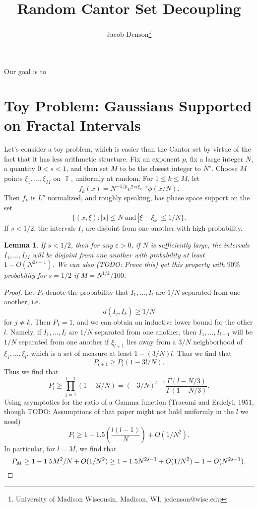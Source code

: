 \documentclass[dvipsnames,letterpaper,12pt]{article}
\title{Random Cantor Set Decoupling}
\author{Jacob Denson\footnote{University of Madison Wisconsin, Madison, WI, jcdenson@wisc.edu}}
\numberwithin{equation}{section}
\DeclareMathOperator{\TT}{\mathbb{T}}
\newtheorem{lemma}[theorem]{Lemma}
\numberwithin{theorem}{section}
\begin{document}
\maketitle

Our goal is to 

\section{Toy Problem: Gaussians Supported on Fractal Intervals}

Let's consider a toy problem, which is easier than the Cantor set by virtue of the fact that it has less arithmetic structure. Fix an exponent $p$, fix a large integer $N$, a quantity $0 < s < 1$, and then set $M$ to be the closest integer to $N^s$. Choose $M$ points $\xi_1,\dots,\xi_M$ on $\TT$, uniformly at random. For $1 \leq k \leq M$, let
%
\[ f_k(x) = N^{-1/p} e^{2 \pi i \xi_k \cdot x} \phi(x/N). \]
%
Then $f_k$ is $L^p$ normalized, and roughly speaking, has phase space support on the set
%
\[ \{ (x,\xi) : |x| \leq N\ \text{and}\ |\xi - \xi_k| \leq 1/N \}. \]
%
If $s < 1/2$, the intervals $I_j$ are disjoint from one another with high probability.

\begin{lemma}
    If $s < 1/2$, then for any $\varepsilon > 0$, if $N$ is sufficiently large, the intervals $I_1,\dots,I_M$ will be disjoint from one another with probability at least $1 - O(N^{2s - 1})$. We can also (TODO: Prove this) get this property with $90\%$ probability for $s = 1/2$ if $M = N^{1/2} / 100$.
\end{lemma}
\begin{proof}
    Let $P_l$ denote the probability that $I_1,\dots,I_l$ are $1/N$ separated from one another, i.e.
    \[ d(I_j, I_k) \geq 1/N \]
    for $j \neq k$. Then $P_1 = 1$, and we can obtain an inductive lower bound for the other $l$. Namely, if $I_1,\dots,I_l$ are $1/N$ separated from one another, then $I_1,\dots,I_{l+1}$ will be $1/N$ separated from one another if $\xi_{l+1}$ lies away from a $3/N$ neighborhood of $\xi_1,\dots,\xi_l$, which is a set of measure at least $1 - (3/N) l$. Thus we find that
    \[ P_{l+1} \geq P_l (1 - 3l/N). \]
    Thus we find that
    \[ P_l \geq \prod_{j = 1}^{l-1} (1 - 3l/N) = (-3/N)^{l-1} \frac{\Gamma(l - N/3)}{\Gamma(1 - N/3)}. \]
    Using asymptotics for the ratio of a Gamma function (Tracomi and Erdelyi, 1951, though TODO: Assumptions of that paper might not hold uniformly in the $l$ we need)
    \[ P_l \geq 1 - 1.5 \left( \frac{l(l-1)}{N} \right) + O(1/N^2). \]
    In particular, for $l = M$, we find that
    \[ P_M \geq 1 - 1.5 M^2 / N + O(1/N^2) \geq 1 - 1.5 N^{2s - 1} + O(1/N^2) = 1 - O(N^{2s-1}). \qedhere \]
\end{proof}
\end{document}
